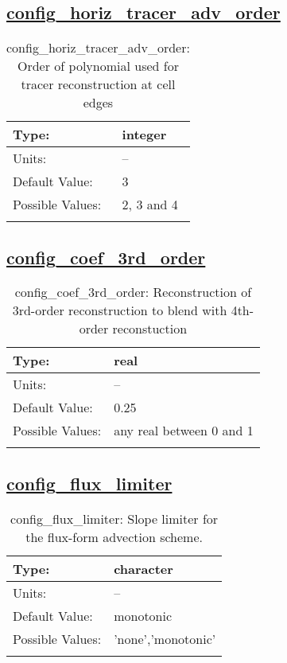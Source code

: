 \subsection[config\_horiz\_tracer\_adv\_order]{\hyperref[sec:nm_tab_advection]{config\_horiz\_tracer\_adv\_order}}
\label{subsec:nm_sec_config_horiz_tracer_adv_order}
\begin{center}
\begin{longtable}{| p{2.0in} || p{4.0in} |}
    \hline
    Type: & integer \\
    \hline
    Units: & -- \\
    \hline
    Default Value: & 3 \\
    \hline
    Possible Values: & 2, 3 and 4 \\
    \hline
    \caption{config\_horiz\_tracer\_adv\_order: Order of polynomial used for tracer reconstruction at cell edges}
\end{longtable}
\end{center}
\subsection[config\_coef\_3rd\_order]{\hyperref[sec:nm_tab_advection]{config\_coef\_3rd\_order}}
\label{subsec:nm_sec_config_coef_3rd_order}
\begin{center}
\begin{longtable}{| p{2.0in} || p{4.0in} |}
    \hline
    Type: & real \\
    \hline
    Units: & -- \\
    \hline
    Default Value: & 0.25 \\
    \hline
    Possible Values: & any real between 0 and 1 \\
    \hline
    \caption{config\_coef\_3rd\_order: Reconstruction of 3rd-order reconstruction to blend with 4th-order reconstuction}
\end{longtable}
\end{center}
\subsection[config\_flux\_limiter]{\hyperref[sec:nm_tab_advection]{config\_flux\_limiter}}
\label{subsec:nm_sec_config_flux_limiter}
\begin{center}
\begin{longtable}{| p{2.0in} || p{4.0in} |}
    \hline
    Type: & character \\
    \hline
    Units: & -- \\
    \hline
    Default Value: & monotonic \\
    \hline
    Possible Values: & 'none','monotonic' \\
    \hline
    \caption{config\_flux\_limiter: Slope limiter for the flux-form advection scheme.}
\end{longtable}
\end{center}
